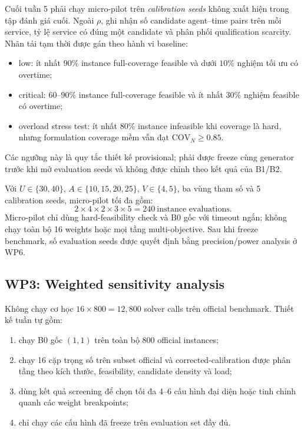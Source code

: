 \documentclass[12pt,a4paper]{article}
\newcommand{\COV}{\mathrm{COV}}
\begin{document}
Cuối tuần 5 phải chạy micro-pilot trên \emph{calibration seeds} không xuất hiện
trong tập đánh giá cuối. Ngoài $\rho$, ghi nhận số candidate agent--time pairs
trên mỗi service, tỷ lệ service có đúng một candidate và phân phối
qualification scarcity. Nhãn tải tạm thời được gán theo hành vi baseline:
\begin{itemize}
  \item low: ít nhất $90\%$ instance full-coverage feasible và dưới $10\%$
        nghiệm tối ưu có overtime;
  \item critical: $60$--$90\%$ instance full-coverage feasible và ít nhất
        $30\%$ nghiệm feasible có overtime;
  \item overload stress test: ít nhất $80\%$ instance infeasible khi coverage
        là hard, nhưng formulation coverage mềm vẫn đạt $\COV_N\geq0.85$.
\end{itemize}
Các ngưỡng này là quy tắc thiết kế provisional; phải được freeze cùng generator
trước khi mở evaluation seeds và không được chỉnh theo kết quả của B1/B2.

Với $U\in\{30,40\}$, $A\in\{10,15,20,25\}$,
$V\in\{4,5\}$, ba vùng tham số và 5 calibration seeds, micro-pilot tối đa gồm:
\begin{equation}
  2\times4\times2\times3\times5=240\ \text{instance evaluations}.
\end{equation}
Micro-pilot chỉ dùng hard-feasibility check và B0 gốc với timeout ngắn; không
chạy toàn bộ 16 weights hoặc mọi tầng multi-objective. Sau khi freeze benchmark,
số evaluation seeds được quyết định bằng precision/power analysis ở WP6.

\subsection{WP3: Weighted sensitivity analysis}

Không chạy cơ học $16\times800=12{,}800$ solver calls trên official benchmark.
Thiết kế tuần tự gồm:
\begin{enumerate}
  \item chạy B0 gốc $(1,1)$ trên toàn bộ 800 official instances;
  \item chạy 16 cặp trọng số trên subset official và corrected-calibration được
        phân tầng theo kích thước, feasibility, candidate density và load;
  \item dùng kết quả screening để chọn tối đa 4--6 cấu hình đại diện hoặc tinh
        chỉnh quanh các weight breakpoints;
  \item chỉ chạy các cấu hình đã freeze trên evaluation set đầy đủ.
\end{enumerate}
\end{document}
